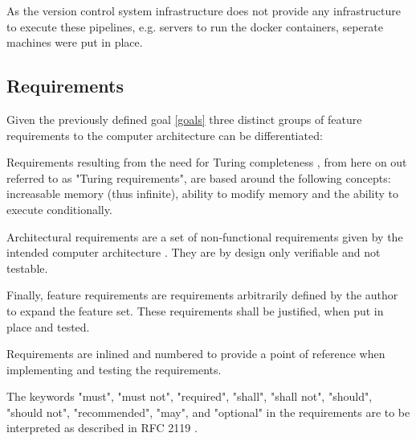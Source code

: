As the version control system infrastructure does not provide any infrastructure to execute these pipelines, e.g. servers to run the docker containers, seperate machines were put in place.

\subsection{Requirements}
Given the previously defined goal \ref{goals} three distinct groups of feature requirements to the computer architecture can be differentiated: 

Requirements resulting from the need for Turing completeness \cite{turing1936a}, from here on out referred to as "Turing requirements", are based around the following concepts: increasable memory (thus infinite), ability to modify memory and the ability to execute conditionally. 

Architectural requirements are a set of non-functional requirements given by the intended computer architecture \cite{vonneuman1945a}. They are by design only verifiable and not testable. 

Finally, feature requirements are requirements arbitrarily defined by the author to expand the feature set. These requirements shall be justified, when put in place and tested.

Requirements are inlined and numbered to provide a point of reference when implementing and testing the requirements. 

\newtheorem{turing-requirement}{Turing Req.}[subsection]
\newtheorem{arch-requirement}{Arch. Req.}[subsection]
\newtheorem{feat-requirement}{Feat. Req.}[subsection]

The keywords "must", "must not", "required", "shall", "shall not", "should", "should not", "recommended",  "may", and "optional" in the requirements are to be interpreted as described in RFC 2119 \cite{rfc2119}.

